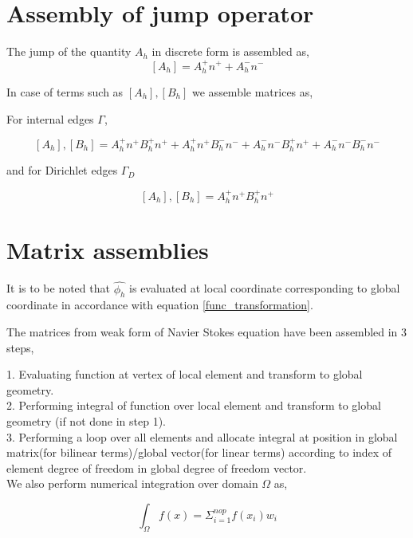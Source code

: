 \documentclass[a4paper,12pt]{book}
\begin{document}
\section{Assembly of jump operator} \label{Jump operator}

The jump of the quantity $A_h$ in discrete form is assembled as,
\begin{equation} \label{Jump_operator}
[A_h] = A_h^+ n^+ + A_h^- n^-
\end{equation}

In case of terms such as $[A_h],[B_h]$ we assemble matrices as, 

For internal edges $\Gamma$,

\begin{equation} \label{Jump operator L2}
[A_h],[B_h] = A_h^+ n^+ B_h^+ n^+ + A_h^+ n^+ B_h^- n^- + A_h^- n^- B_h^+ n^+ + A_h^- n^- B_h^- n^-
\end{equation}

and for Dirichlet edges $\Gamma_D$

\begin{equation} \label{Jump operator L2 for dirichlet}
[A_h],[B_h] = A_h^+ n^+ B_h^+ n^+ 
\end{equation}


\section{Matrix assemblies}

It is to be noted that $\hat{\phi_h}$ is evaluated at local coordinate corresponding to global coordinate in accordance with equation \ref{func_transformation}.

The matrices from weak form of Navier Stokes equation have been assembled in 3 steps,

1. Evaluating function at vertex of local element and transform to global geometry.\\
2. Performing integral of function over local element and transform to global geometry (if not done in step 1).\\
3. Performing a loop over all elements and allocate integral at position in global matrix(for bilinear terms)/global vector(for linear terms) according to index of element degree of freedom in global degree of freedom vector.\\

We also perform numerical integration over domain $\Omega$ as,

\begin{equation}\label{numerical integration}
\int_{\Omega} f(x) = \Sigma_{i=1}^{nop} f(x_i) w_i
\end{equation}
\end{document}
